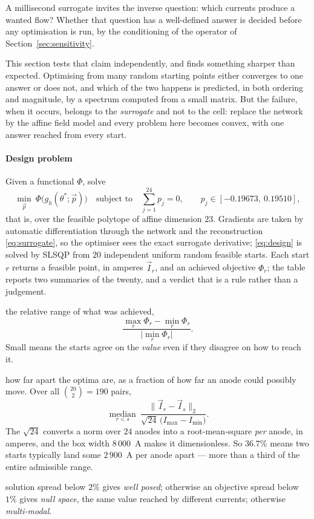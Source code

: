 \documentclass[11pt,a4paper]{article}
\theoremstyle{plain}
\theoremstyle{definition}
\theoremstyle{remark}
\begin{document}
A millisecond surrogate invites the inverse question: which currents produce a
wanted flow? Whether that question has a well-defined answer is decided before
any optimisation is run, by the conditioning of the operator of
Section~\ref{sec:sensitivity}.

This section tests that claim independently, and finds something sharper than
expected. Optimising from many random starting points either converges to one
answer or does not, and which of the two happens is predicted, in both ordering
and magnitude, by a spectrum computed from a small matrix. But the failure, when
it occurs, belongs to the \emph{surrogate} and not to the cell: replace the
network by the affine field model and every problem here becomes convex, with
one answer reached from every start.

\label{def:design}
\paragraph{Design problem}
Given a functional $\Phi$, solve
\begin{equation}
\label{eq:design}
\min_{\vec{p}} \ \Phi\bigl(g_h(\theta^*;\vec{p})\bigr)
\quad\text{subject to}\quad
\sum_{j=1}^{24}p_j = 0,
\qquad p_j \in [-0.19673,\ 0.19510],
\end{equation}
that is, over the feasible polytope of affine dimension $23$.
Gradients are taken by automatic differentiation through the network and the
reconstruction \eqref{eq:surrogate}, so the optimiser sees the exact surrogate
derivative; \eqref{eq:design} is solved by SLSQP from $20$ independent uniform
random feasible starts. Each start $r$ returns a feasible point, in amperes
$\vec I_r$, and an achieved objective $\Phi_r$; the table reports two summaries
of the twenty, and a verdict that is a rule rather than a judgement.

\begin{description}\itemsep3pt
\item[objective spread] the relative range of what was achieved,
\[
  \frac{\max_r \Phi_r - \min_r \Phi_r}{\bigl|\min_r \Phi_r\bigr|}.
\]
Small means the starts agree on the \emph{value} even if they disagree on how to
reach it.

\item[solution spread] how far apart the optima are, as a fraction of how far an
anode could possibly move. Over all $\binom{20}{2}=190$ pairs,
\[
  \operatorname*{median}_{r<s}\
  \frac{\bigl\|\vec I_r - \vec I_s\bigr\|_2}{\sqrt{24}\,\bigl(I_{\max}-I_{\min}\bigr)} .
\]
The $\sqrt{24}$ converts a norm over $24$ anodes into a root-mean-square
\emph{per} anode, in amperes, and the box width $8\,000$~A makes it
dimensionless. So $36.7\%$ means two starts typically land some $2\,900$~A per
anode apart --- more than a third of the entire admissible range.

\item[verdict] solution spread below $2\%$ gives \emph{well posed}; otherwise an
objective spread below $1\%$ gives \emph{null space}, the same value reached by
different currents; otherwise \emph{multi-modal}.
\end{description}
\end{document}
